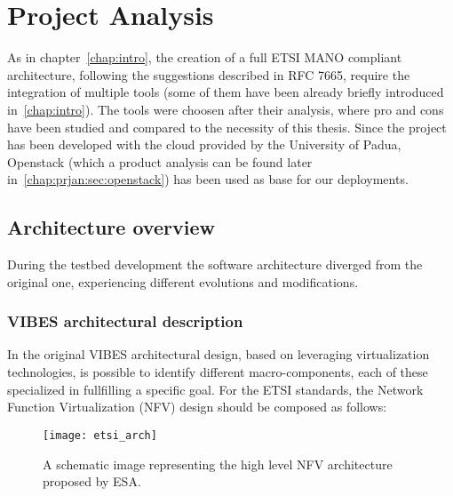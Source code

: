 \chapter{Project Analysis}
\label{chap:prjan}

As in chapter~\ref{chap:intro}, the creation of a full ETSI MANO compliant
architecture, following the suggestions described in RFC 7665, require the
integration of multiple tools (some of them have been already briefly introduced
in~\ref{chap:intro}). The tools were choosen after their analysis, where pro and
cons have been studied and compared to the necessity of this thesis. Since the
project has been developed with the cloud provided by the University of Padua,
Openstack (which a product analysis can be found later
in~\ref{chap:prjan:sec:openstack}) has been used as base for our deployments.

\section{Architecture overview}

During the testbed development the software architecture diverged from the
original one, experiencing different evolutions and modifications.

\subsection{VIBES architectural description}

In the original VIBES architectural design, based on leveraging virtualization
technologies, is possible to identify different macro-components, each of these
specialized in fullfilling a specific goal. For the ETSI standards, the Network
Function Virtualization (NFV) design should be composed as follows:
\begin{figure}[t]
 \centering \texttt{[image: etsi\_arch]}
 \caption{A schematic image representing the high level NFV architecture
   proposed by ESA.}
 \label{chap:prjan:img:etsi_arch}
\end{figure}

